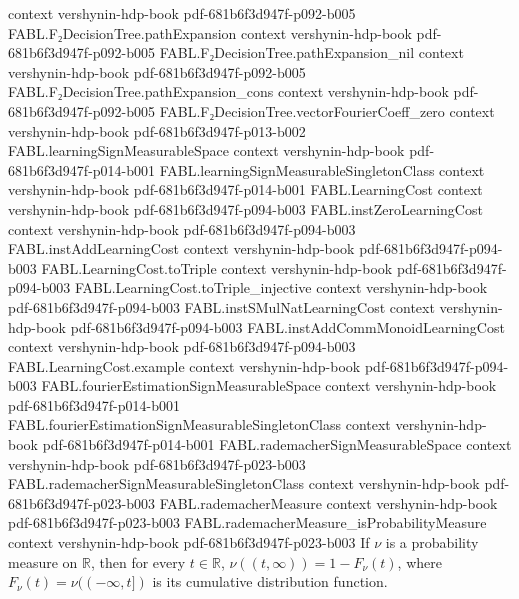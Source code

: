 \begin{theorem}
  {context}
  {vershynin-hdp-book}
  {pdf-681b6f3d947f-p092-b005}
\proofstep
  {FABL.F₂DecisionTree.pathExpansion}
  {context}
  {vershynin-hdp-book}
  {pdf-681b6f3d947f-p092-b005}
\proofstep
  {FABL.F₂DecisionTree.pathExpansion_nil}
  {context}
  {vershynin-hdp-book}
  {pdf-681b6f3d947f-p092-b005}
\proofstep
  {FABL.F₂DecisionTree.pathExpansion_cons}
  {context}
  {vershynin-hdp-book}
  {pdf-681b6f3d947f-p092-b005}
\proofstep
  {FABL.F₂DecisionTree.vectorFourierCoeff_zero}
  {context}
  {vershynin-hdp-book}
  {pdf-681b6f3d947f-p013-b002}
\proofstep
  {FABL.learningSignMeasurableSpace}
  {context}
  {vershynin-hdp-book}
  {pdf-681b6f3d947f-p014-b001}
\proofstep
  {FABL.learningSignMeasurableSingletonClass}
  {context}
  {vershynin-hdp-book}
  {pdf-681b6f3d947f-p014-b001}
\proofstep
  {FABL.LearningCost}
  {context}
  {vershynin-hdp-book}
  {pdf-681b6f3d947f-p094-b003}
\proofstep
  {FABL.instZeroLearningCost}
  {context}
  {vershynin-hdp-book}
  {pdf-681b6f3d947f-p094-b003}
\proofstep
  {FABL.instAddLearningCost}
  {context}
  {vershynin-hdp-book}
  {pdf-681b6f3d947f-p094-b003}
\proofstep
  {FABL.LearningCost.toTriple}
  {context}
  {vershynin-hdp-book}
  {pdf-681b6f3d947f-p094-b003}
\proofstep
  {FABL.LearningCost.toTriple_injective}
  {context}
  {vershynin-hdp-book}
  {pdf-681b6f3d947f-p094-b003}
\proofstep
  {FABL.instSMulNatLearningCost}
  {context}
  {vershynin-hdp-book}
  {pdf-681b6f3d947f-p094-b003}
\proofstep
  {FABL.instAddCommMonoidLearningCost}
  {context}
  {vershynin-hdp-book}
  {pdf-681b6f3d947f-p094-b003}
\proofstep
  {FABL.LearningCost.example}
  {context}
  {vershynin-hdp-book}
  {pdf-681b6f3d947f-p094-b003}
\proofstep
  {FABL.fourierEstimationSignMeasurableSpace}
  {context}
  {vershynin-hdp-book}
  {pdf-681b6f3d947f-p014-b001}
\proofstep
  {FABL.fourierEstimationSignMeasurableSingletonClass}
  {context}
  {vershynin-hdp-book}
  {pdf-681b6f3d947f-p014-b001}
\proofstep
  {FABL.rademacherSignMeasurableSpace}
  {context}
  {vershynin-hdp-book}
  {pdf-681b6f3d947f-p023-b003}
\proofstep
  {FABL.rademacherSignMeasurableSingletonClass}
  {context}
  {vershynin-hdp-book}
  {pdf-681b6f3d947f-p023-b003}
\proofstep
  {FABL.rademacherMeasure}
  {context}
  {vershynin-hdp-book}
  {pdf-681b6f3d947f-p023-b003}
\proofstep
  {FABL.rademacherMeasure_isProbabilityMeasure}
  {context}
  {vershynin-hdp-book}
  {pdf-681b6f3d947f-p023-b003}
\label{FABL.measureReal_Ioi_eq_one_sub_cdf}
\leanok
{}
If $\nu$ is a probability measure on $\mathbb{R}$, then for every $t\in\mathbb{R}$,
$\nu((t,\infty))=1-F_\nu(t)$, where $F_\nu(t)=\nu((-\infty,t])$ is its cumulative
distribution function.
\end{theorem}

